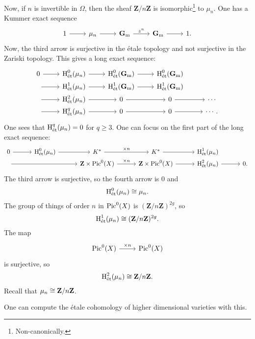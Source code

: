 \documentclass [11 pt, oneside] {article}
\begin{document}
Now, if $n$ is invertible in $\Omega$, then the sheaf $\mathbf{Z}/n\mathbf{Z}$ is isomorphic\footnote{Non-canonically.} to $\mu_{n}$. 
One has a Kummer exact sequence
\[
\begin{tikzcd}
	1\ar[r]& \mu_{n}\ar[r]& \mathbf{G}\sub{m}\ar[r,"z^{n}"] & \mathbf{G}\sub{m}\ar[r] & 1.
\end{tikzcd}
\]
Now, the third arrow is surjective in the \'etale topology and not surjective in the Zariski topology.
This gives a long exact sequence:
\[
\begin{tikzcd}[row sep = 0 em]
	  0\ar[r] & \etco^{0}(\mu_{n}) \ar[r] & \etco^{0}(\mathbf{G}\sub{m}) \ar[r] & \etco^{0}(\mathbf{G}\sub{m}) \\
	  \text{}\ar[r] & \etco^{1}(\mu_{n}) \ar[r] & \etco^{1}(\mathbf{G}\sub{m}) \ar[r] & \etco^{1}(\mathbf{G}\sub{m}) \\
	  \text{}\ar[r] & \etco^{2}(\mu_{n}) \ar[r] &0\ar[r] &0 \ar[r] &\cdots\\
	  \text{}\ar[r] &\etco^{q}(\mu_{n}) \ar[r]&0\ar[r]&0\ar[r]&\cdots.
\end{tikzcd}
\]
One sees that $\operatorname{H}_{\textup {\'et}}^{q}(\mu_{n}) =0$ for $q\ge 3$. One can focus on the first part of the long exact sequence:
\[
\begin{tikzcd}[column sep = 3 em, row sep = 0 em]
	0\ar[r] & \etco^{0}(\mu_{n}) \ar[r] & K^{*}\ar[r, "\times n"] & K^{*} \ar[r] & \etco^{1}(\mu_{n}) \\ 
	\text{} \ar[rr]&& \mathbf{Z}\times \Pic^0(X)\ar[r,"\times n"] &\mathbf{Z}\times \Pic^0(X) \ar[r] & \etco^{2}(\mu_{n}) \ar[r] &0.
\end{tikzcd}
\]
The third arrow is surjective, so the fourth arrow is $0$ and
\begin{align*}
	\operatorname{H}_{\textup {\'et}}^{0}(\mu_{n}) \cong \mu_{n}.
\end{align*}
The group of things of order $n$ in $\operatorname{Pic}^0(X)$ is $(\mathbf{Z}/n\mathbf{Z})^{2g}$, so
\begin{align*}
	\operatorname{H}_{\textup {\'et}}^{1}(\mu_{n}) \cong (\mathbf{Z}/n\mathbf{Z}) ^{2g}. 
\end{align*}
The map 
\[
\begin{tikzcd}
	\Pic^{0}(X)\ar[r,"\times n"] &\Pic ^{0}(X)
\end{tikzcd}
\]
is surjective, so
\begin{align*}
	\operatorname{H}_{\textup {\'et}}^{2}(\mu_{n})\cong \mathbf{Z}/n\mathbf{Z}.
\end{align*}
Recall that $\mu_n\cong\mathbf Z/n\mathbf Z$.

One can compute the \'etale cohomology of higher dimensional varieties with this.
\end{document}
